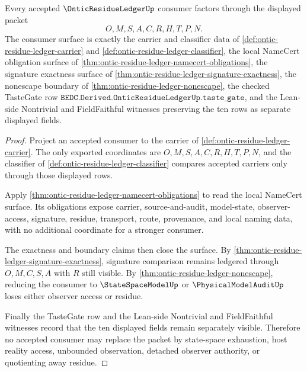\begin{theorem}
\label{thm:ontic-residue-ledger-scoped-consumer-surface}
Every accepted $\OnticResidueLedgerUp$ consumer factors through the displayed packet
$$
O,M,S,A,C,R,H,T,P,N.
$$
The consumer surface is exactly the carrier and classifier data of \autoref{def:ontic-residue-ledger-carrier} and \autoref{def:ontic-residue-ledger-classifier}, the local NameCert obligation surface of \autoref{thm:ontic-residue-ledger-namecert-obligations}, the signature exactness surface of \autoref{thm:ontic-residue-ledger-signature-exactness}, the nonescape boundary of \autoref{thm:ontic-residue-ledger-nonescape}, the checked TasteGate row $\texttt{BEDC.Derived.OnticResidueLedgerUp.taste\_gate}$, and the Lean-side Nontrivial and FieldFaithful witnesses preserving the ten rows as separate displayed fields.
\end{theorem}
\begin{proof}
Project an accepted consumer to the carrier of \autoref{def:ontic-residue-ledger-carrier}. The only exported coordinates are $O,M,S,A,C,R,H,T,P,N$, and the classifier of \autoref{def:ontic-residue-ledger-classifier} compares accepted carriers only through those displayed rows.

Apply \autoref{thm:ontic-residue-ledger-namecert-obligations} to read the local NameCert surface. Its obligations expose carrier, source-and-audit, model-state, observer-access, signature, residue, transport, route, provenance, and local naming data, with no additional coordinate for a stronger consumer.

The exactness and boundary claims then close the surface. By \autoref{thm:ontic-residue-ledger-signature-exactness}, signature comparison remains ledgered through $O,M,C,S,A$ with $R$ still visible. By \autoref{thm:ontic-residue-ledger-nonescape}, reducing the consumer to $\StateSpaceModelUp$ or $\PhysicalModelAuditUp$ loses either observer access or residue.

Finally the TasteGate row and the Lean-side Nontrivial and FieldFaithful witnesses record that the ten displayed fields remain separately visible. Therefore no accepted consumer may replace the packet by state-space exhaustion, host reality access, unbounded observation, detached observer authority, or quotienting away residue.
\end{proof}

